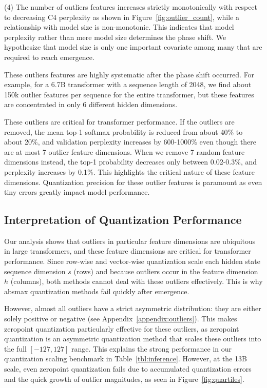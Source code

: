 (4) The number of outliers features increases strictly monotonically with respect to decreasing C4 perplexity as shown in Figure~\ref{fig:outlier_count}, while a relationship with model size is non-monotonic. This indicates that model perplexity rather than mere model size determines the phase shift. We hypothesize that model size is only one important covariate among many that are required to reach emergence.

These outliers features are highly systematic after the phase shift occurred. For example, for a 6.7B transformer with a sequence length of 2048, we find about 150k outlier features per sequence for the entire transformer, but these features are concentrated in only 6 different hidden dimensions. 

These outliers are critical for transformer performance. If the outliers are removed, the mean top-1 softmax probability is reduced from about 40\% to about 20\%, and validation perplexity increases by 600-1000\% even though there are at most 7 outlier feature dimensions. When we remove 7 random feature dimensions instead, the top-1 probability decreases only between 0.02-0.3\%, and perplexity increases by 0.1\%. This highlights the critical nature of these feature dimensions. Quantization precision for these outlier features is paramount as even tiny errors greatly impact model performance.

\subsection{Interpretation of Quantization Performance}

Our analysis shows that outliers in particular feature dimensions are ubiquitous in large transformers, and these feature dimensions are critical for transformer performance. Since row-wise and vector-wise quantization scale each hidden state sequence dimension $s$ (rows) and because outliers occur in the feature dimension $h$ (columns), both methods cannot deal with these outliers effectively. This is why absmax quantization methods fail quickly after emergence.

However, almost all outliers have a strict asymmetric distribution: they are either solely positive or negative (see Appendix~\ref{appendix:outliers}). This makes zeropoint quantization particularly effective for these outliers, as zeropoint quantization is an asymmetric quantization method that scales these outliers into the full $[-127, 127]$ range. This explains the strong performance in our quantization scaling benchmark in Table~\ref{tbl:inference}. However, at the 13B scale, even zeropoint quantization fails due to accumulated quantization errors and the quick growth of outlier magnitudes, as seen in Figure~\ref{fig:quartiles}.

